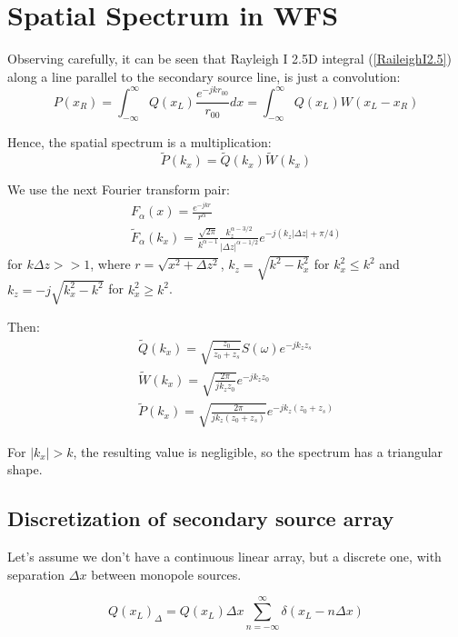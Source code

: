 \section{Spatial Spectrum in WFS}
Observing carefully, it can be seen that Rayleigh I 2.5D integral (\autoref{RaileighI2.5}) along a line parallel to the secondary source line, is just a convolution:
\begin{equation}
P(x_R) = \int_{-\infty}^{\infty} Q(x_L) \frac{e^{-jkr_{00}}}{r_{00}} dx = \int_{-\infty}^{\infty} Q(x_L) W(x_L - x_R)
\end{equation}

Hence, the spatial spectrum is a multiplication:
\begin{equation}
\tilde{P}(k_x) = \tilde{Q}(k_x) \tilde{W}(k_x)
\end{equation}

We use the next Fourier transform pair:
\begin{gather}
	F_\alpha(x) = \frac{e^{-j k r}}{r^\alpha} \\
	\tilde{F}_\alpha(k_x) = \frac{\sqrt{2\pi}}{k^{\alpha - 1}} \frac{k_z^{\alpha - 3/2}}{\left\vert \Delta z \right\vert^{\alpha - 1/2}} e^{-j(k_z\vert\Delta z\vert + \pi/4)}
\end{gather}
for $k\Delta z >> 1$, where $r = \sqrt{x^2 + \Delta z^2}$, $k_z = \sqrt{k^2 - k_x^2}$ for $k_x^2 \leq k^2$ and $k_z = -j\sqrt{k_x^2 - k^2}$ for $k_x^2 \geq k^2$.

Then:
\begin{gather}
	\tilde{Q}(k_x) = \sqrt{\frac{z_0}{z_0 + z_s}}S(\omega)e^{-j k_z z_s} \\
	\tilde{W}(k_x) = \sqrt{\frac{2\pi}{j k_z z_0}} e^{-j k_z z_0} \\
	\tilde{P}(k_x) = \sqrt{\frac{2\pi}{j k_z (z_0 + z_s)}} e^{-j k_z (z_0 + z_s)}
\end{gather}

For $|k_x| > k$, the resulting value is negligible, so the spectrum has a triangular shape.

\subsection{Discretization of secondary source array}
Let's assume we don't have a continuous linear array, but a discrete one, with separation $\Delta x$ between monopole sources.

\begin{equation}
Q(x_L)_\Delta = Q(x_L) \Delta x \sum_{n=-\infty}^{\infty} \delta(x_L - n\Delta x)
\end{equation}

